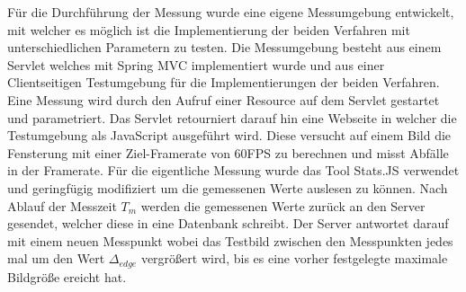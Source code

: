 Für die Durchführung der Messung wurde eine eigene Messumgebung entwickelt, 
mit welcher es möglich ist die Implementierung der beiden Verfahren mit unterschiedlichen Parametern zu testen.
Die Messumgebung besteht aus einem Servlet welches mit Spring MVC implementiert wurde und aus einer Clientseitigen Testumgebung für die Implementierungen der beiden Verfahren.
Eine Messung wird durch den Aufruf einer Resource auf dem Servlet gestartet und parametriert.
Das Servlet retourniert darauf hin eine Webseite in welcher die Testumgebung als JavaScript ausgeführt wird.
Diese versucht auf einem Bild die Fensterung mit einer Ziel-Framerate von 60FPS zu berechnen und misst Abfälle in der Framerate.
Für die eigentliche Messung wurde das Tool Stats.JS verwendet und geringfügig modifiziert um die gemessenen Werte auslesen zu können.
Nach Ablauf der Messzeit $T_m$ werden die gemessenen Werte zurück an den Server gesendet, welcher diese in eine Datenbank schreibt.
Der Server antwortet darauf mit einem neuen Messpunkt wobei das Testbild zwischen den Messpunkten jedes mal um den Wert $\Delta_{edge}$ vergrößert wird, 
bis es eine vorher festgelegte maximale Bildgröße ereicht hat.

